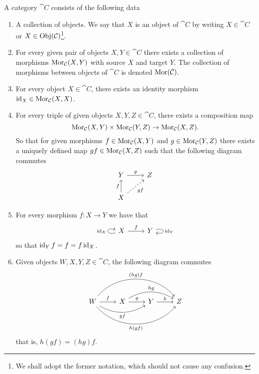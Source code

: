 \begin{definition}[Category]\label{def: category}
A category \(\cat C\) consists of the following data
\begin{enumerate}[(C1)]
\item A collection of objects. We say that \(X\) is an object of \(\cat C\)
  by writing \(X \in \cat C\) or \(X \in \operatorname{Obj}(\mathcal C)\)\footnote{We shall adopt
  the former notation, which should not cause any confusion.}.
\item For every given pair of objects \(X, Y \in \cat C\) there exists a
  collection of morphisms \(\operatorname{Mor}_{\mathcal C}(X, Y)\) with source \(X\) and
  target \(Y\). The collection of morphisms between objects of \(\cat C\) is
  denoted \(\operatorname{Mor}(\mathcal C)\).
\item For every object \(X \in \cat C\), there exists an identity morphism
  \(\operatorname{id}_X \in \operatorname{Mor}_{\mathcal C}(X, X)\).
\item For every triple of given objects \(X, Y, Z \in \cat C\), there exists
  a composition map
  \[
    \operatorname{Mor}_{\mathcal C}(X, Y) \times \operatorname{Mor}_{\mathcal C}(Y, Z) \to \operatorname{Mor}_{\mathcal C}(X, Z).
  \]
  So that for given morphisms \(f \in \operatorname{Mor}_{\mathcal C}(X, Y)\) and \(g \in
  \operatorname{Mor}_{\mathcal C}(Y, Z)\) there exists a uniquely defined map \(g  f \in
  \operatorname{Mor}_{\mathcal C}(X, Z)\) such that the following diagram commutes
  \[
    \begin{tikzcd}
      Y \ar[r, "g"]
        &Z \\
      X \ar[u, "f"] \ar[ru, dashed, swap, "g  f"]
    \end{tikzcd}
  \]
\item For every morphism \(f: X \to Y\) we have that
  \[
    \begin{tikzcd}
      X \ar[r, "f"] \ar[loop left, "\Id_X"] &Y \ar[loop right, "\Id_Y"]
    \end{tikzcd}
  \]
  so that \(\operatorname{id}_Y  f = f = f  \operatorname{id}_X\).
\item Given objects \(W, X, Y, Z \in \cat C\), the following diagram commutes
  \[
    \begin{tikzcd}
      W
      \ar[r, "f"]
      \ar[rr, bend right, swap, "g  f"]
      \ar[rrr, bend right = 50, swap, "h  (g  f)"]
      \ar[rrr, bend left = 50, "(h  g)  f"]
        &X
        \ar[r, "g"] \ar[rr, bend left, "h  g"]
          &Y
          \ar[r, "h"]
            &Z
    \end{tikzcd}
  \]
  that is, \(h  (g  f) = (h  g)  f\).
\end{enumerate}
\end{definition}

